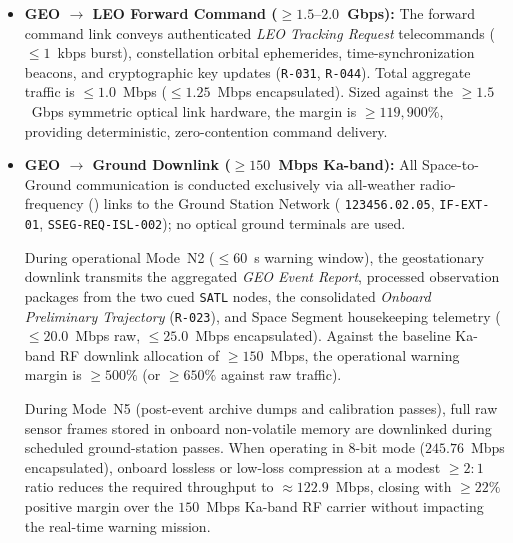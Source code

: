 \begin{itemize}
    In Mode~N5 (calibration and post-event archive dumping), full uncompressed dual-band imagery is offloaded from mass memory across the feeder link. At nominal 8-bit depth ($R_{\text{enc}} = 245.76$~Mbps), the link achieves a margin of $\ge 510\%$ against $1.5$~Gbps ($\ge 714\%$ against $2.0$~Gbps). Even under worst-case 16-bit calibration dumping ($R_{\text{enc}} = 491.52$~Mbps), the link retains a $\ge 205\%$ margin against $1.5$~Gbps and $\ge 307\%$ against $2.0$~Gbps.
    
    \item \textbf{GEO $\rightarrow$ LEO Forward Command ($\ge 1.5\text{--}2.0$~Gbps):} 
    The forward command link conveys authenticated \emph{LEO Tracking Request} telecommands ($\le 1$~kbps burst), constellation orbital ephemerides, time-synchronization beacons, and  cryptographic key updates (\texttt{R-031}, \texttt{R-044}). Total aggregate traffic is $\le 1.0$~Mbps ($\le 1.25$~Mbps encapsulated). Sized against the $\ge 1.5$~Gbps symmetric optical link hardware, the margin is $\ge 119{,}900\%$, providing deterministic, zero-contention command delivery.
    
    \item \textbf{GEO $\rightarrow$ Ground  Downlink ($\ge 150$~Mbps Ka-band):} 
    All Space-to-Ground communication is conducted exclusively via all-weather radio-frequency () links to the Ground Station Network ( \texttt{123456.02.05}, \texttt{IF-EXT-01}, \texttt{SSEG-REQ-ISL-002}); no optical ground terminals are used.
    
    During operational Mode~N2 ($\le 60$~s warning window), the geostationary downlink transmits the aggregated \emph{GEO Event Report}, processed observation packages from the two cued \texttt{SATL} nodes, the consolidated \emph{Onboard Preliminary Trajectory} (\texttt{R-023}), and Space Segment housekeeping telemetry ($\le 20.0$~Mbps raw, $\le 25.0$~Mbps encapsulated). Against the baseline Ka-band RF downlink allocation of $\ge 150$~Mbps, the operational warning margin is $\ge 500\%$ (or $\ge 650\%$ against raw traffic).
    
    During Mode~N5 (post-event archive dumps and calibration passes), full raw sensor frames stored in onboard non-volatile memory are downlinked during scheduled ground-station passes. When operating in 8-bit mode ($245.76$~Mbps encapsulated), onboard lossless or low-loss compression at a modest $\ge 2{:}1$ ratio reduces the required throughput to $\approx 122.9$~Mbps, closing with $\ge 22\%$ positive margin over the $150$~Mbps Ka-band RF carrier without impacting the real-time warning mission.
\end{itemize}

